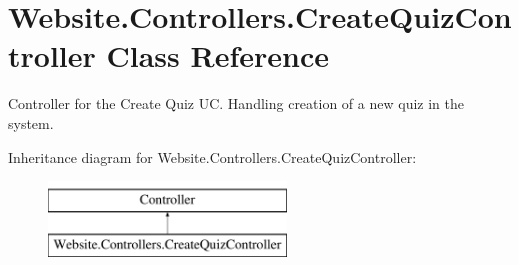 \hypertarget{class_website_1_1_controllers_1_1_create_quiz_controller}{}\section{Website.\+Controllers.\+Create\+Quiz\+Controller Class Reference}
\label{class_website_1_1_controllers_1_1_create_quiz_controller}


Controller for the Create Quiz U\+C. Handling creation of a new quiz in the system.  


Inheritance diagram for Website.\+Controllers.\+Create\+Quiz\+Controller\+:\begin{figure}[H]
\begin{center}
\leavevmode
\includegraphics[height=2.000000cm]{class_website_1_1_controllers_1_1_create_quiz_controller}
\end{center}
\end{figure}

